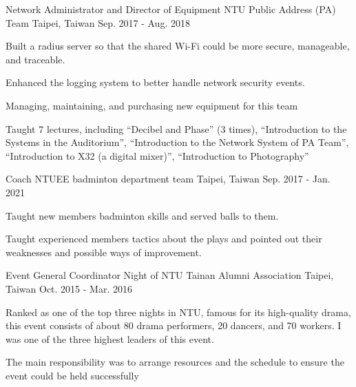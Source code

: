 \begin{cventries}
  \cventry
    {Network Administrator and Director of Equipment} %
    {NTU Public Address (PA) Team} %
    {Taipei, Taiwan} %
    {Sep. 2017 - Aug. 2018} %
    {
        \begin{cvitems} %
        \item Built a radius server so that the shared Wi-Fi could be more secure, manageable, and traceable.
        \item Enhanced the logging system to better handle network security events.
        \item Managing, maintaining, and purchasing new equipment for this team
        \item Taught 7 lectures, including ``Decibel and Phase'' (3 times), ``Introduction to the Systems in the Auditorium'', ``Introduction to the Network System of PA Team'', ``Introduction to X32 (a digital mixer)'', ``Introduction to Photography''
        \end{cvitems}
    }

  \cventry
    {Coach} %
    {NTUEE badminton department team} %
    {Taipei, Taiwan} %
    {Sep. 2017 - Jan. 2021} %
    {
        \begin{cvitems} %
        \item Taught new members badminton skills and served balls to them.
        \item Taught experienced members tactics about the plays and pointed out their weaknesses and possible ways of improvement.
        \end{cvitems}
    }


  \cventry
    {Event General Coordinator} %
    {Night of NTU Tainan Alumni Association} %
    {Taipei, Taiwan} %
    {Oct. 2015 - Mar. 2016} %
    {
        \begin{cvitems} %
        \item Ranked as one of the top three nights in NTU, famous for its high-quality drama, this event consists of about 80 drama performers, 20 dancers, and 70 workers. I was one of the three highest leaders of this event.
        \item The main responsibility was to arrange resources and the schedule to ensure the event could be held successfully
        \end{cvitems}
    }
\end{cventries}
